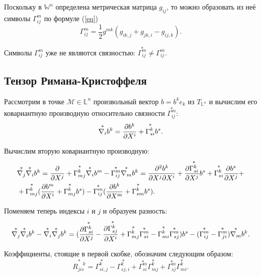 \documentclass[14pt,a4paper]{scrartcl}
\begin{document}
Поскольку в $\mathbb{W}^n$ определена метрическая матрица $g_{ij}$, то можно образовать из неё символы $\Gamma_{ij}^m$ по формуле (\ref{eq})
\begin{equation}\label{eq25}
 \Gamma_{ij}^m = \frac{1}{2}g^{mk}(g_{ik,j} + g_{jk,i} - g_{ij,k}).
\end{equation}

Символы $\Gamma_{ij}^m$ уже не являются связностью: $\overset{*}{\Gamma_{ij}^m} \neq  \Gamma_{ij}^m$.


\subsection{Тензор Римана-Кристоффеля}
Рассмотрим в точке $\mathcal{M} \in \mathbb{L}^n$ произвольный вектор $b = b^ke_k$ из $T_{\mathbb{L}^n}$ и вычислим его ковариантную производную относительно связности $\overset{*}{\Gamma_{ij}^m}$:
\begin{equation} \label{eq 28}
	\overset{*}{\nabla_i}b^k = \pdv{b^k}{X^i} + \overset{*}{\Gamma_{si}^k}b^s.
\end{equation}

Вычислим вторую ковариантную производную:
\begin{align}\label{eq29}
\begin{split}
	&\overset{*}{\nabla_j} \overset{*}{\nabla_i} b^k = \pdv{}{X^j} (\overset{*}{\nabla_i}b^k) + \overset{*}{\Gamma_{mj}^k} \overset{*}{\nabla_i} b^m - \overset{*}{\Gamma_{ij}^m} \overset{*}{\nabla_m} b^k = \pdv{b^k}{X^j}{X^i} + \pdv{\overset{*}{\Gamma_{si}^k}}{X^j}b^s + \overset{*}{\Gamma_{si}^k} \pdv{b^s}{X^j} +\\ &+\overset{*}{\Gamma_{mj}^k} (\pdv{b^m}{X^i} + \overset{*}{\Gamma_{mj}^k} b^s) - \overset{*}{\Gamma_{ij}^m}(\pdv{b^k}{X^m} + \overset{*}{\Gamma_{sm}^k}b^s).
\end{split}	
\end{align}

Поменяем теперь индексы $i$ и $j$ и образуем разность:
\begin{equation}\label{eq30}
	\overset{*}{\nabla_j} \overset{*}{\nabla_i} b^k - \overset{*}{\nabla_i} \overset{*}{\nabla_j} b^k = (\pdv{\overset{*}{\Gamma_{si}^k}}{X^j} - \pdv{\overset{*}{\Gamma_{sj}^k}}{X^i} + \overset{*}{\Gamma_{mj}^k} \overset{*}{\Gamma_{si}^m} - \overset{*}{\Gamma_{mi}^k} \overset{*}{\Gamma_{sj}^m})b^s - (\overset{*}{\Gamma_{ij}^m} - \overset{*}{\Gamma_{ji}^m}) \overset{*}{\nabla_m}b^k.
\end{equation}


Коэффициенты, стоящие в первой скобке, обозначим следующим образом:
\begin{equation}\label{eq31}
	\overset{*}{R_{jis}^{\quad k}} = \overset{*}{\Gamma_{si,j}^k} - \overset{*}{\Gamma_{sj,i}^k} + \overset{*}{\Gamma_{si}^m} \overset{*}{\Gamma_{mj}^k} + \overset{*}{\Gamma_{sj}^m} \overset{*}{\Gamma_{mi}^k}.
\end{equation}
\end{document}
